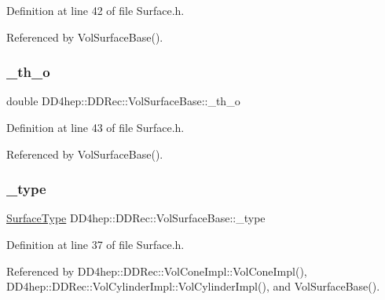 Definition at line 42 of file Surface.\+h.



Referenced by Vol\+Surface\+Base().

\hypertarget{class_d_d4hep_1_1_d_d_rec_1_1_vol_surface_base_ab60dbb9ad72a790cbfa119edaa225e36}{}\label{class_d_d4hep_1_1_d_d_rec_1_1_vol_surface_base_ab60dbb9ad72a790cbfa119edaa225e36} 
\subsubsection{\texorpdfstring{\+\_\+th\+\_\+o}{\_th\_o}}
{\footnotesize\ttfamily double D\+D4hep\+::\+D\+D\+Rec\+::\+Vol\+Surface\+Base\+::\+\_\+th\+\_\+o\hspace{0.3cm}{\ttfamily [protected]}}



Definition at line 43 of file Surface.\+h.



Referenced by Vol\+Surface\+Base().

\hypertarget{class_d_d4hep_1_1_d_d_rec_1_1_vol_surface_base_a7a377fec84bd131b42eb0fb672585850}{}\label{class_d_d4hep_1_1_d_d_rec_1_1_vol_surface_base_a7a377fec84bd131b42eb0fb672585850} 
\subsubsection{\texorpdfstring{\+\_\+type}{\_type}}
{\footnotesize\ttfamily \hyperlink{class_d_d_surfaces_1_1_surface_type}{Surface\+Type} D\+D4hep\+::\+D\+D\+Rec\+::\+Vol\+Surface\+Base\+::\+\_\+type\hspace{0.3cm}{\ttfamily [protected]}}



Definition at line 37 of file Surface.\+h.



Referenced by D\+D4hep\+::\+D\+D\+Rec\+::\+Vol\+Cone\+Impl\+::\+Vol\+Cone\+Impl(), D\+D4hep\+::\+D\+D\+Rec\+::\+Vol\+Cylinder\+Impl\+::\+Vol\+Cylinder\+Impl(), and Vol\+Surface\+Base().

